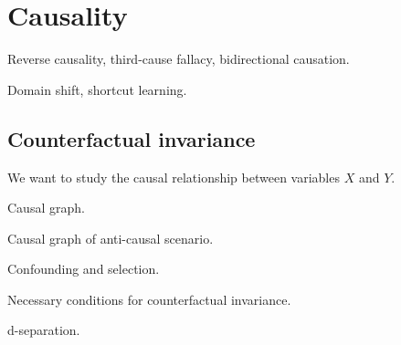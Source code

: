 \section{Causality}

Reverse causality, third-cause fallacy, bidirectional causation.

Domain shift, shortcut learning.

\subsection{Counterfactual invariance}

We want to study the causal relationship between variables $X$ and $Y$.

Causal graph.

Causal graph of anti-causal scenario.

Confounding and selection.

Necessary conditions for counterfactual invariance.

d-separation.
